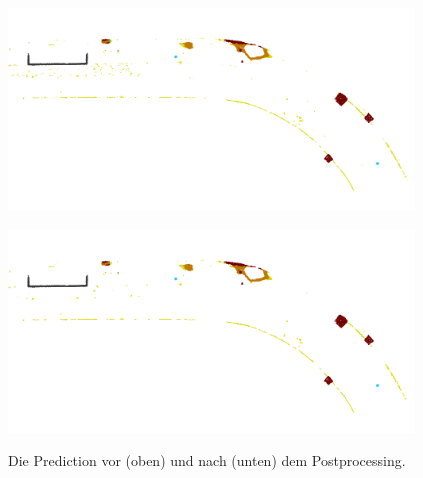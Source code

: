 \begin{figure}
    {\includegraphics[width=0.96\textwidth]{graphics/eval_right_prediction}}
    \par\smallskip
    {\includegraphics[width=0.96\textwidth]{graphics/eval_right_postproc}}
    \caption{Die Prediction vor (oben) und nach (unten) dem Postprocessing.}
    \label{fig:cmp_postproc}
\end{figure}

